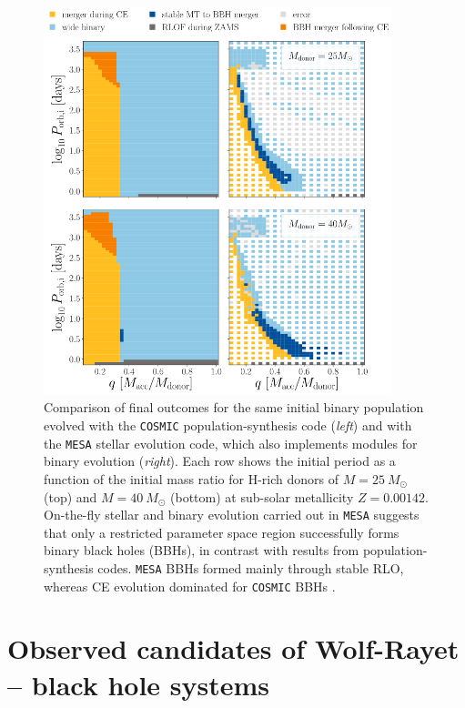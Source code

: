 \documentclass[a4paper,titlepage]{book}     	%
\newcommand{\sun}{\ensuremath{_\odot}}
\newcommand{\msun}{\ensuremath{M\sun}}
\begin{document}
\begin{figure}[h!]
		\centering
		\includegraphics[width=0.9\textwidth]{./images/MESAvspopsynth.png}	
	\caption{Comparison of final outcomes for the same initial binary population evolved with the \texttt{COSMIC} population-synthesis code \cite{breivik2020cosmicpopsynth} (\emph{left}) and with the \texttt{MESA} stellar evolution code, which also implements modules for binary evolution \cite{MESA2015BinaryMT} (\emph{right}). Each row shows the initial period as a function of the initial mass ratio for H-rich donors of $M = 25~\msun$ (top) and $M = 40~\msun$ (bottom) at sub-solar metallicity $Z=0.00142$. On-the-fly stellar and binary evolution carried out in \texttt{MESA} suggests that only a restricted parameter space region successfully forms binary black holes (BBHs), in contrast with results from population-synthesis codes. \texttt{MESA} BBHs formed mainly through stable RLO, whereas CE evolution dominated for \texttt{COSMIC} BBHs \cite{gallegos2021MESAvspopsynth}.}\label{fig:MESAvsPopsynth}
\end{figure}




\section{Observed candidates of Wolf-Rayet -- black hole systems}\label{sec:WRBHobserved}
\end{document}
